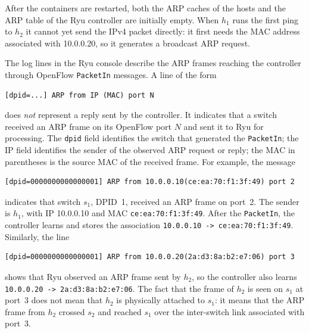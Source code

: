 \documentclass[11pt,a4paper]{article}
\newcommand{\code}[1]{\texttt{#1}}
\begin{document}
After the containers are restarted, both the ARP caches of the hosts and the ARP
table of the Ryu controller are initially empty. When $h_1$ runs the first ping
to $h_2$ it cannot yet send the IPv4 packet directly: it first needs the MAC
address associated with 10.0.0.20, so it generates a broadcast ARP request.

The log lines in the Ryu console describe the ARP frames reaching the controller
through OpenFlow \code{PacketIn} messages. A line of the form
\begin{lstlisting}
[dpid=...] ARP from IP (MAC) port N
\end{lstlisting}
does \emph{not} represent a reply sent by the controller. It indicates that a
switch received an ARP frame on its OpenFlow port $N$ and sent it to Ryu for
processing. The \code{dpid} field identifies the switch that generated the
\code{PacketIn}; the IP field identifies the sender of the observed ARP request
or reply; the MAC in parentheses is the source MAC of the received frame. For
example, the message
\begin{lstlisting}
[dpid=0000000000000001] ARP from 10.0.0.10(ce:ea:70:f1:3f:49) port 2
\end{lstlisting}
indicates that switch $s_1$, DPID~1, received an ARP frame on port~2. The sender
is $h_1$, with IP 10.0.0.10 and MAC \code{ce:ea:70:f1:3f:49}. After the
\code{PacketIn}, the controller learns and stores the association
\code{10.0.0.10 -> ce:ea:70:f1:3f:49}. Similarly, the line
\begin{lstlisting}
[dpid=0000000000000001] ARP from 10.0.0.20(2a:d3:8a:b2:e7:06) port 3
\end{lstlisting}
shows that Ryu observed an ARP frame sent by $h_2$, so the controller also learns
\code{10.0.0.20 -> 2a:d3:8a:b2:e7:06}. The fact that the frame of $h_2$ is seen on
$s_1$ at port~3 does not mean that $h_2$ is physically attached to $s_1$: it
means that the ARP frame from $h_2$ crossed $s_2$ and reached $s_1$ over the
inter-switch link associated with port~3.
\end{document}
